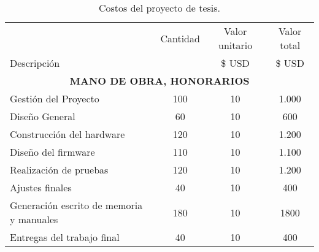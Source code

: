 \begin{table}[htpb]
\centering
\caption{Costos del proyecto de tesis.}
\label{tab:presupuesto}
\small
\begin{tabularx}{\linewidth}{@{}|X|c|r|r|@{}}
\hline
\rowcolor[HTML]{C0C0C0} 
\multicolumn{4}{|c|}{\cellcolor[HTML]{C0C0C0}COSTOS DIRECTOS} \\ \hline
\rowcolor[HTML]{C0C0C0} 
 &
  \multicolumn{1}{c|}{\cellcolor[HTML]{C0C0C0}Cantidad} &
  \multicolumn{1}{c|}{\cellcolor[HTML]{C0C0C0}Valor unitario} &
  \multicolumn{1}{c|}{\cellcolor[HTML]{C0C0C0}Valor total} \\ 
\rowcolor[HTML]{C0C0C0} Descripción  &
  \multicolumn{1}{c|}{\cellcolor[HTML]{C0C0C0}} &
  \multicolumn{1}{c|}{\cellcolor[HTML]{C0C0C0} \$ USD} &
  \multicolumn{1}{c|}{\cellcolor[HTML]{C0C0C0} \$ USD} \\ \hline
  
\multicolumn{4}{|c|}{\textbf{MANO DE OBRA, HONORARIOS }}\\ \hline
Gestión del Proyecto		& \multicolumn{1}{c|}{	100	} & \multicolumn{1}{c|}{	10	} &  \multicolumn{1}{c|}{	1.000	} \\ \hline
Diseño General				& \multicolumn{1}{c|}{	60	} & \multicolumn{1}{c|}{	10	} &  \multicolumn{1}{c|}{	600	} \\ \hline
Construcción del hardware	& \multicolumn{1}{c|}{	120	} & \multicolumn{1}{c|}{	10	} &  \multicolumn{1}{c|}{	1.200	} \\ \hline
Diseño del firmware			& \multicolumn{1}{c|}{	110	} & \multicolumn{1}{c|}{	10	} &  \multicolumn{1}{c|}{	1.100	} \\ \hline
Realización de pruebas		& \multicolumn{1}{c|}{	120	} & \multicolumn{1}{c|}{	10	} &  \multicolumn{1}{c|}{	1.200	} \\ \hline
Ajustes finales				& \multicolumn{1}{c|}{	40	} & \multicolumn{1}{c|}{	10	} &  \multicolumn{1}{c|}{	400	} \\ \hline
Generación escrito de memoria y manuales	& \multicolumn{1}{c|}{	180	} & \multicolumn{1}{c|}{	10	} &  \multicolumn{1}{c|}{	1800	} \\ \hline
Entregas del trabajo final	& \multicolumn{1}{c|}{	40	} & \multicolumn{1}{c|}{	10	} &  \multicolumn{1}{c|}{	400	} \\ \hline


\end{tabularx}
\end{table}
